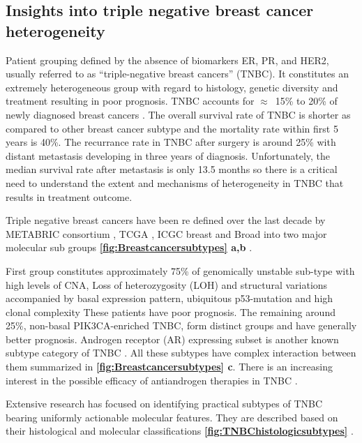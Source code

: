 \subsection{Insights into triple negative breast cancer heterogeneity}
Patient grouping defined by the absence of biomarkers ER, PR, and HER2, usually referred to as ``triple-negative breast cancers'' (TNBC). It constitutes an extremely heterogeneous group with regard to histology, genetic diversity and treatment resulting in poor prognosis. TNBC accounts for $\approx$~15\% to 20\% of newly diagnosed breast cancers \cite{reis2008triple}.
The overall survival rate of TNBC is shorter as compared to other breast cancer subtype and the mortality rate within first 5 years is 40\%. The recurrance rate in TNBC after surgery is  around 25\% with distant metastasis developing in three years of diagnosis. Unfortunately, the median survival rate after metastasis is only 13.5 months \cite{dent2007triple,lin2008sites} so there is a critical need to understand the extent and mechanisms of heterogeneity in TNBC that results in treatment outcome. 

Triple negative breast cancers have been re defined over the last decade by METABRIC consortium \cite{curtis2012genomic, dvinge2013shaping, pereira2016somatic, dawson2013new, bilal2013improving}, TCGA \cite{weinstein2013cancer}, ICGC breast \cite{international2010international} and Broad \cite{banerji2012sequence, rheinbay2017recurrent} into two major molecular sub groups \textbf{\autoref{fig:Breastcancersubtypes} a,b} \cite{xu2014omics}.

First group constitutes approximately 75\% of genomically unstable sub-type with high levels of \ac{CNA}, Loss of heterozygosity (LOH) and structural variations accompanied by basal expression pattern, ubiquitous p53-mutation and high clonal complexity \cite{shah2012clonal, garrido2019insights} These patients have poor prognosis. The remaining around 25\%,  non-basal PIK3CA-enriched TNBC, form distinct groups and have generally better prognosis. Androgen receptor (AR) expressing subset is another known subtype category of TNBC \cite{tang2012expression, rakha2007prognostic,mrklic2013expression}. All these subtypes have complex interaction between them summarized in \textbf{\autoref{fig:Breastcancersubtypes} c}.
There is an increasing interest in the possible efficacy of antiandrogen therapies in TNBC \cite{gerratana2018androgen,gucalp2013phase}.

 Extensive research has focused on identifying practical subtypes of TNBC bearing uniformly actionable molecular features. They are described based on their histological and molecular classifications \textbf{\autoref{fig:TNBChistologicsubtypes}} \cite{weigelt2009histological,bianchini2016triple}. 

